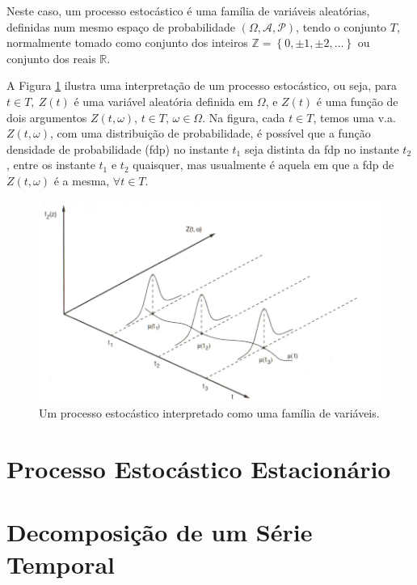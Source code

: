 \documentclass[
	12pt,				%
	openright,			%
	oneside,      %
	a4paper,			%
	english,			%
	french,				%
	spanish,			%
	brazil,				%
	]{abntex2}\usepackage[]{graphicx}\usepackage[table]{xcolor}
\theoremstyle{definition}
\theoremstyle{remark}
\begin{document}
Neste caso, um processo estocástico é uma família de variáveis aleatórias, definidas num mesmo espaço de probabilidade $(\Omega, \mathcal{A}, \mathcal{P})$, tendo o conjunto $T$, normalmente tomado como conjunto dos inteiros $\mathbb{Z} = \left\{0,\pm 1, \pm 2, \ldots \right\}$ ou conjunto dos reais $\mathbb{R}$.

A Figura \ref{img3} ilustra uma interpretação de um processo estocástico, ou seja, para $t \in T,\ Z(t)$ é uma variável aleatória definida em $\Omega$, e $Z(t)$ é uma função de dois argumentos $Z(t, \omega)$, $t \in T$, $\omega \in \Omega$. Na figura, cada $t \in T$, temos uma v.a. $Z(t, \omega)$, com uma distribuição de probabilidade, é possível que a função densidade de probabilidade (fdp) no instante $t_1$ seja distinta da fdp no instante $t_2$, entre os instante $t_1$ e $t_2$ quaisquer, mas usualmente é aquela em que a fdp de $Z(t, \omega)$ é a mesma, $\forall t \in T$.



\begin{figure}
  \caption{\label{img3}Um processo estocástico interpretado como uma família de variáveis.}
    \begin{center}
      \includegraphics[scale = 0.9]{image/img3.png}
    \end{center}
\end{figure}




  \section{Processo Estocástico Estacionário}




  \section{Decomposição de um Série Temporal}
  
\end{document}
